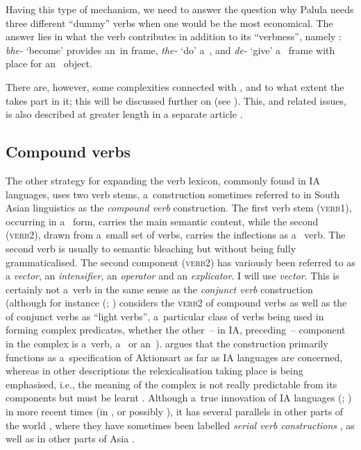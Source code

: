 Having this type of mechanism, we need to answer the question why Palula needs three different ``dummy'' verbs when one would be the most economical. The answer lies in what the verb contributes in addition to its ``verbness'', namely : \textit{bhe-} `become' provides an~in frame, \textit{the-} `do' a~, and \textit{de-} `give' a~ frame with place for an~ object. 


There are, however, some complexities connected with , and to what extent the  takes part in it; this will be discussed further on (see ). This, and related issues, is also described at greater length in a separate article \citep{liljegren2010}.


\subsection{Compound verbs}
\label{subsec:8-6-2}

The other strategy for expanding the verb lexicon, commonly found in IA languages, uses two verb stems, a~construction sometimes referred to in South Asian linguistics \citep[326]{masica1991} as the \textit{compound verb} construction. The first verb stem (\textsc{verb1}), occurring in a~ form, carries the main semantic content, while the second (\textsc{verb2}), drawn from a~small set of verbs, carries the inflections as a~ verb. The second verb is usually  to semantic bleaching but without being fully grammaticalised. The second component (\textsc{verb2}) has variously been referred to as a \textit{vector}, an \textit{intensifier}, an \textit{operator} and an \textit{explicator}. I will use \textit{vector}. This is certainly not a~verb  in the same sense as the \textit{conjunct verb} construction (although for instance \citeauthor{butt1993} (\citeyear[31]{butt1993}; \citeyear[49]{butt2010}) considers the \textsc{verb2} of compound verbs as well as the  of conjunct verbs as ``light verbs'', a~particular class of verbs being used in forming complex predicates, whether the other~-- in IA, preceding~-- component in the complex is a~verb, a~ or an~). \citet[326--330]{masica1991} argues that the construction primarily functions as a~specification of Aktionsart as far as IA languages are concerned, whereas in other descriptions the relexicalisation taking place is being emphasised, i.e., the meaning of the complex is not really predictable from its components but must be learnt \citep[143]{schmidt1999}. Although a~true innovation of IA languages (\citealt[326]{masica1991}; \citealt{hook1977}) in more recent times (in , or possibly ), it has several parallels in other parts of the world \citep[348--349]{hook1977}, where they have sometimes been labelled \textit{serial verb constructions} \citep{ansaldo2006}, as well as in other parts of Asia \citep[559]{ebert2006}. 



